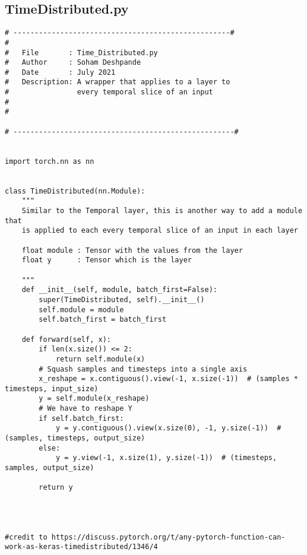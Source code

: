\documentclass{article}
\begin{document}
\subsection{TimeDistributed.py}
\begin{lstlisting}
# ---------------------------------------------------#
#
#   File       : Time_Distributed.py
#   Author     : Soham Deshpande
#   Date       : July 2021
#   Description: A wrapper that applies to a layer to
#                every temporal slice of an input
#
#

# ----------------------------------------------------#


import torch.nn as nn


class TimeDistributed(nn.Module):
    """
    Similar to the Temporal layer, this is another way to add a module that
    is applied to each every temporal slice of an input in each layer

    float module : Tensor with the values from the layer
    float y      : Tensor which is the layer

    """
    def __init__(self, module, batch_first=False):
        super(TimeDistributed, self).__init__()
        self.module = module
        self.batch_first = batch_first

    def forward(self, x):
        if len(x.size()) <= 2:
            return self.module(x)
        # Squash samples and timesteps into a single axis
        x_reshape = x.contiguous().view(-1, x.size(-1))  # (samples * timesteps, input_size)
        y = self.module(x_reshape)
        # We have to reshape Y
        if self.batch_first:
            y = y.contiguous().view(x.size(0), -1, y.size(-1))  # (samples, timesteps, output_size)
        else:
            y = y.view(-1, x.size(1), y.size(-1))  # (timesteps, samples, output_size)

        return y




#credit to https://discuss.pytorch.org/t/any-pytorch-function-can-work-as-keras-timedistributed/1346/4


\end{lstlisting}
\clearpage
\end{document}
